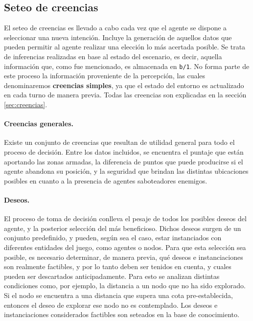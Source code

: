 \documentclass[oneside]{book}
\theoremstyle{definition}
\theoremstyle{example}
\begin{document}
\subsection{Seteo de creencias}

\label{sec:seteoCreencias}

El seteo de creencias es llevado a cabo cada vez que el agente se dispone a 
seleccionar una nueva intención. Incluye la generación de aquellos datos que pueden 
permitir al agente realizar una elección lo más acertada posible. Se trata de 
inferencias realizadas en base al estado del escenario, es decir, aquella información 
que, como fue mencionado, es almacenada en \texttt{b/1}. No forma parte de este proceso 
la información proveniente de la percepción, las cuales denominaremos \textbf{creencias
simples}, ya que el estado del entorno es actualizado 
en cada turno de manera previa. Todas las creencias son explicadas en 
la sección \ref{sec:creencias}.

\paragraph{Creencias generales.}

Existe un conjunto de creencias que resultan de utilidad general para todo el proceso 
de decisión. Entre los datos incluidos, se encuentra el puntaje que están 
aportando las zonas armadas, la diferencia de puntos que puede producirse si el agente 
abandona su posición, y la seguridad que brindan las distintas ubicaciones posibles en 
cuanto a la presencia de agentes saboteadores enemigos. 

\paragraph{Deseos.}

El proceso de toma de decisión conlleva el 
pesaje de todos los posibles deseos del agente, y la posterior selección del más beneficioso. 
Dichos deseos surgen de un conjunto predefinido, y pueden, según sea el caso, estar 
instanciados con diferentes entidades del juego, como agentes o nodos. Para que esta 
selección sea posible, es necesario determinar, de manera previa, qué deseos e instanciaciones 
son realmente factibles, y por lo tanto deben ser tenidos en cuenta, y cuales pueden ser 
descartados anticipadamente.
Para esto se analizan distintas condiciones como, por ejemplo, la distancia a un nodo 
que no ha sido explorado. Si el nodo se encuentra a una distancia que supera una cota 
pre-establecida, entonces el deseo de explorar ese nodo no es contemplado.
Los deseos e instanciaciones considerados factibles son seteados en la base de conocimiento.
\end{document}
